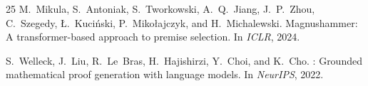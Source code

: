\documentclass[11pt]{article}
\begin{document}
\begin{thebibliography}{25}
M.~Mikula, S.~Antoniak, S.~Tworkowski, A.~Q.~Jiang, J.~P.~Zhou,
  C.~Szegedy, {\L}.~Kuci{\'n}ski, P.~Miko{\l}ajczyk, and
  H.~Michalewski.
\newblock Magnushammer: A transformer-based approach to premise
  selection.
\newblock In \emph{ICLR}, 2024.

S.~Welleck, J.~Liu, R.~Le~Bras, H.~Hajishirzi, Y.~Choi, and
  K.~Cho.
: Grounded mathematical proof generation with
  language models.
\newblock In \emph{NeurIPS}, 2022.

\end{thebibliography}
\end{document}
